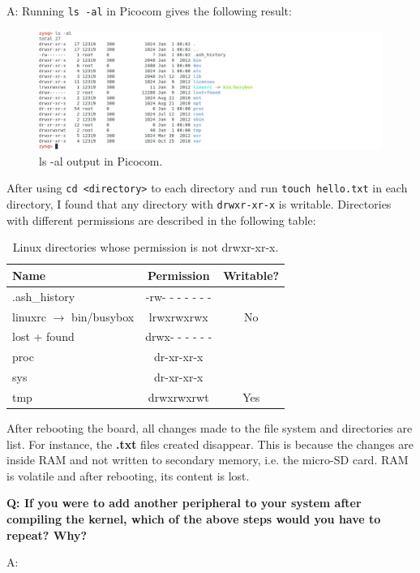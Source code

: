 \documentclass[11pt,letterpaper,titlepage]{article}
\begin{document}
A: Running \verb|ls -al| in Picocom gives the following result:

\begin{figure}[ht]
    \centering
    \includegraphics[width=\textwidth]{ls.png}
    \caption{ls -al output in Picocom.}
\end{figure}

After using \verb|cd <directory>| to each directory and run \verb|touch hello.txt| in each directory, I found that any directory with \verb|drwxr-xr-x| is writable. Directories with different permissions are described in the following table:

\begin{table}[ht]
\centering
\begin{tabular}{@{}lcc@{}}
\toprule
Name                              & Permission & Writable? \\ \midrule
.ash\_history                     & -rw- - - - - - - &           \\ \midrule
linuxrc $\rightarrow$ bin/busybox & lrwxrwxrwx & No        \\ \midrule
lost + found                      & drwx- - - - - - &           \\ \midrule
proc                              & dr-xr-xr-x &           \\ \midrule
sys                               & dr-xr-xr-x &           \\ \midrule
tmp                               & drwxrwxrwt & Yes       \\ \bottomrule
\end{tabular}
\caption{Linux directories whose permission is not drwxr-xr-x.}
\end{table}


After rebooting the board, all changes made to the file system and directories are list. For instance, the \textbf{.txt} files created disappear. This is because the changes are inside RAM and not written to secondary memory, i.e. the micro-SD card. RAM is volatile and after rebooting, its content is lost.

\textbf{Q: If you were to add another peripheral to your system after compiling the kernel, which of the above steps would you have to repeat? Why?}

A: 

\newpage

\begin{appendices}

\end{appendices}
\end{document}
